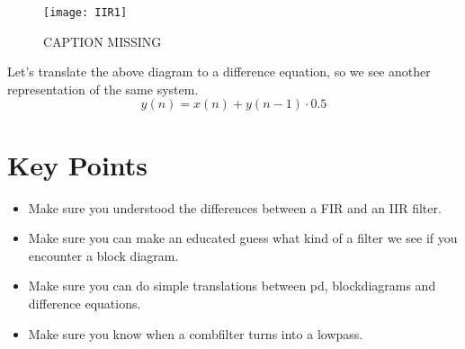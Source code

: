 \begin{figure}[H]
	\centering
	\texttt{[image: IIR1]}
	\caption[shortCaption]
	{CAPTION MISSING}
	\label{fig:label}
\end{figure}

Let's translate the above diagram to a difference equation, so we see another representation of the same system.
\begin{equation}
 	y(n) = x(n)+y(n-1) \cdot 0.5
 \end{equation} 



\section{Key Points}
\begin{itemize}
	\item Make sure you understood the differences between a FIR and an IIR filter.
	\item Make sure you can make an educated guess what kind of a filter we see if you encounter a block diagram.
	\item Make sure you can do simple translations between pd, blockdiagrams and difference equations.
	\item Make sure you know when a combfilter turns into a lowpass.
\end{itemize}

















